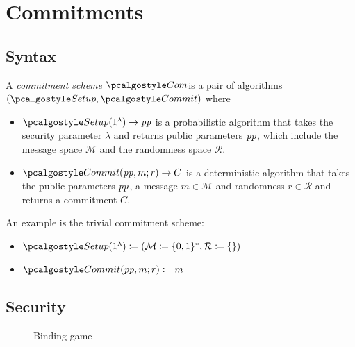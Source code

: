 \section{Commitments}\label{sec:commitments}


\subsection{Syntax}
\begin{definition}
  A \emph{commitment scheme} $\algo{Com}$is a pair of \ppt algorithms $(\algo{Setup}, \algo{Commit})$ where
  \begin{itemize}
    \item $\algo{Setup}(1^\lambda) \rightarrow \params$ is a probabilistic algorithm that takes the security parameter $\lambda$ and returns public parameters $\mathit{pp}$, which include the message space $\mathcal{M}$ and the randomness space $\mathcal{R}$.
    \item $\algo{Commit}(\params, m; r) \rightarrow C$ is a deterministic algorithm that takes the public parameters $\mathit{pp}$, a message $m \in \mathcal{M}$ and randomness $r \in \mathcal{R}$ and returns a commitment $C$.
  \end{itemize}
\end{definition}

\begin{example}
  An example is the trivial commitment scheme\label{sec:trivial-com}:
  \begin{itemize}
    \item $\algo{Setup}(1^\lambda) \defeq (\mathcal{M} \defeq \{0, 1\}^*, \mathcal{R} \defeq \{\})$
    \item $\algo{Commit}(\params,m;r) \defeq m$
  \end{itemize}
\end{example}

\subsection{Security}

\begin{figure}[tbhp]
  \begin{center}
    \begin{tcolorbox}[width=8cm]
      \begin{pchstack}[center]
      \end{pchstack}
    \end{tcolorbox}
  \end{center}
  \caption{Binding game \label{fig:break-com-bind}}
\end{figure}

